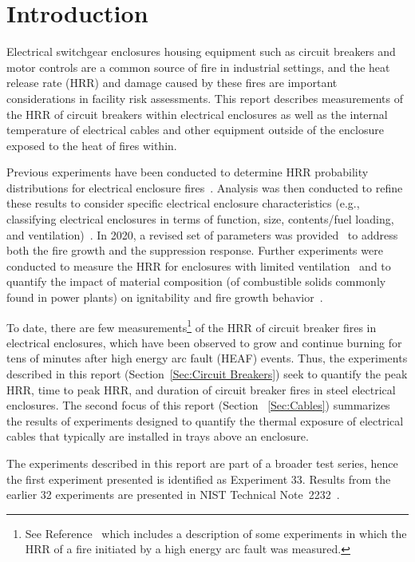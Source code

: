 \section{Introduction}

Electrical switchgear enclosures housing equipment such as circuit breakers and motor controls are a common source of fire in industrial settings, and the heat release rate (HRR) and damage caused by these fires are important considerations in facility risk assessments. This report describes measurements of the HRR of circuit breakers within electrical enclosures as well as the internal temperature of electrical cables and other equipment outside of the enclosure exposed to the heat of fires within.

Previous experiments have been conducted to determine HRR probability distributions for electrical enclosure fires~\cite{NUREG/CR-7197}. Analysis was then conducted to refine these results to consider specific electrical enclosure characteristics (e.g., classifying electrical enclosures in terms of function, size, contents/fuel loading, and ventilation)~\cite{NUREG-2178}. In 2020, a revised set of parameters was provided~\cite{NUREG2230} to address both the fire growth and the suppression response. Further experiments were conducted to measure the HRR for enclosures with limited ventilation~\cite{OLIVE-FIRE} and to quantify the impact of material composition (of combustible solids commonly found in power plants) on ignitability and fire growth behavior~\cite{leventon2024nist}.

To date, there are few measurements\footnote{See Reference~\cite{NEA_HEAF_2017} which includes a description of some experiments in which the HRR of a fire initiated by a high energy arc fault was measured.} of the HRR of circuit breaker fires in electrical enclosures, which have been observed to grow and continue burning for tens of minutes after high energy arc fault (HEAF) events. Thus, the experiments described in this report (Section~\ref{Sec:Circuit Breakers}) seek to quantify the peak HRR, time to peak HRR, and duration of circuit breaker fires in steel electrical enclosures. The second focus of this report (Section~ \ref{Sec:Cables}) summarizes the results of experiments designed to quantify the thermal exposure of electrical cables that typically are installed in trays above an enclosure.

The experiments described in this report are part of a broader test series, hence the first experiment presented is identified as Experiment 33. Results from the earlier 32 experiments are presented in NIST Technical Note~2232~\cite{OLIVE-FIRE}.

